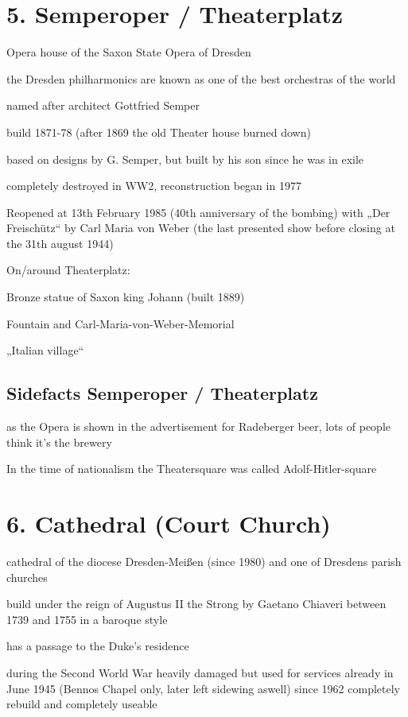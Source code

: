 \documentclass[a4paper,12pt]{report}
\begin{document}
\section{5. Semperoper / Theaterplatz}
\begin{itemize*}
\item Opera house of the Saxon State Opera of Dresden
\item the Dresden philharmonics are known as one of the best orchestras of the world
\item named after architect Gottfried Semper
\item build 1871-78 (after 1869 the old Theater house burned down)
\item based on designs by G. Semper, but built by his son since he was in exile
\item completely destroyed in WW2, reconstruction began in 1977
\item Reopened at 13th February 1985 (40th anniversary of the bombing) with „Der Freischütz“ by Carl Maria von Weber (the last presented show before closing at the 31th august 1944)
\item On/around Theaterplatz:
    \begin{itemize*}
    \item Bronze statue of Saxon king Johann (built 1889)
    \item Fountain and Carl-Maria-von-Weber-Memorial
    \item „Italian village“
    \end{itemize*}
\end{itemize*}
\subsection{Sidefacts Semperoper / Theaterplatz}
\begin{itemize*}
\item as the Opera is shown in the advertisement for Radeberger beer, lots of people think it’s the brewery
\item In the time of nationalism the Theatersquare was called Adolf-Hitler-square
\end{itemize*}

\section{6. Cathedral (Court Church)}
\begin{itemize*}
\item cathedral of the diocese Dresden-Meißen (since 1980) and one of Dresdens parish churches
\item build under the reign of Augustus II the Strong by Gaetano Chiaveri between 1739 and 1755 in a baroque style
\item has a passage to the Duke's residence
\item during the Second World War heavily damaged but used for services already in June 1945 (Bennos Chapel only, later left sidewing aswell) since 1962 completely rebuild and completely useable
\end{itemize*}
\end{document}
